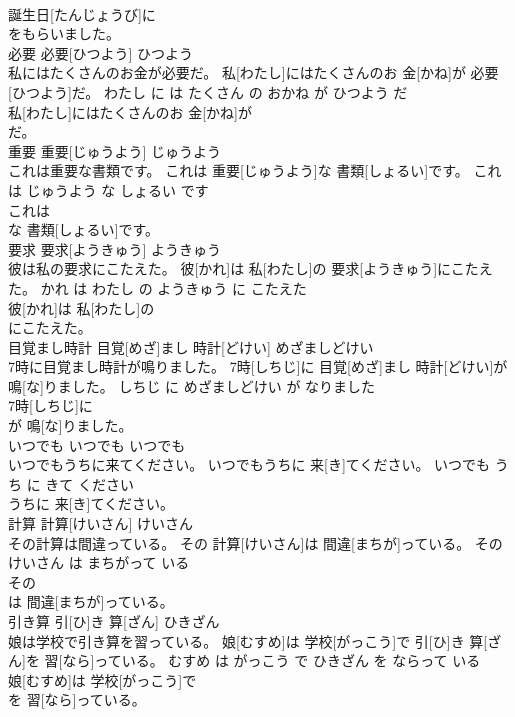 \documentclass[8pt]{extreport}
\begin{document}
\begin{CJK}{UTF8}{min}
\\	誕生日[たんじょうび]に
\\	をもらいました。		
\\	必要	必要[ひつよう]	ひつよう	
\\	私にはたくさんのお金が必要だ。	私[わたし]にはたくさんのお 金[かね]が 必要[ひつよう]だ。	わたし に は たくさん の おかね が ひつよう だ	
\\	私[わたし]にはたくさんのお 金[かね]が
\\	だ。		
\\	重要	重要[じゅうよう]	じゅうよう	
\\	これは重要な書類です。	これは 重要[じゅうよう]な 書類[しょるい]です。	これ は じゅうよう な しょるい です	
\\	これは
\\	な 書類[しょるい]です。		
\\	要求	要求[ようきゅう]	ようきゅう	
\\	彼は私の要求にこたえた。	彼[かれ]は 私[わたし]の 要求[ようきゅう]にこたえた。	かれ は わたし の ようきゅう に こたえた	
\\	彼[かれ]は 私[わたし]の
\\	にこたえた。		
\\	目覚まし時計	目覚[めざ]まし 時計[どけい]	めざましどけい	
\\	7時に目覚まし時計が鳴りました。	7時[しちじ]に 目覚[めざ]まし 時計[どけい]が 鳴[な]りました。	しちじ に めざましどけい が なりました	
\\	7時[しちじ]に
\\	が 鳴[な]りました。		
\\	いつでも	いつでも	いつでも	
\\	いつでもうちに来てください。	いつでもうちに 来[き]てください。	いつでも うち に きて ください	
\\	うちに 来[き]てください。		
\\	計算	計算[けいさん]	けいさん	
\\	その計算は間違っている。	その 計算[けいさん]は 間違[まちが]っている。	その けいさん は まちがって いる	
\\	その
\\	は 間違[まちが]っている。		
\\	引き算	引[ひ]き 算[ざん]	ひきざん	
\\	娘は学校で引き算を習っている。	娘[むすめ]は 学校[がっこう]で 引[ひ]き 算[ざん]を 習[なら]っている。	むすめ は がっこう で ひきざん を ならって いる	
\\	娘[むすめ]は 学校[がっこう]で
\\	を 習[なら]っている。		

\end{CJK}
\end{document}
